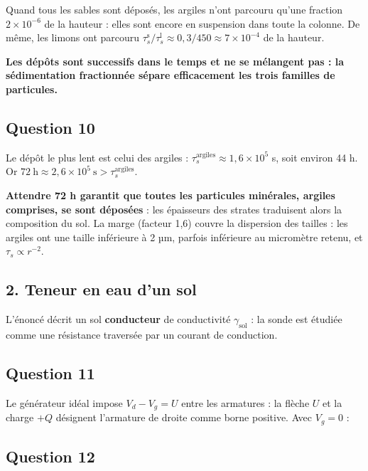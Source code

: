 \documentclass[11pt,a4paper]{article}
\newcommand{\equationajustee}[1]{%
  \sbox{\boiteequation}{$\displaystyle #1$}%
  \ifdim\wd\boiteequation>\linewidth
    \[\resizebox{\linewidth}{!}{\usebox{\boiteequation}}\]%
  \else
    \[#1\]%
  \fi}
\begin{document}
Quand tous les sables sont déposés, les argiles n'ont parcouru qu'une fraction \(2\times10^{-6}\) de la hauteur : elles sont encore en suspension dans toute la colonne. De même, les limons ont parcouru \(\tau_s^{\text{s}}/\tau_s^{\text{l}}\approx0{,}3/450\approx7\times10^{-4}\) de la hauteur.

\textbf{Les dépôts sont successifs dans le temps et ne se mélangent pas : la sédimentation fractionnée sépare efficacement les trois familles de particules.}

\hypertarget{question-10}{%
\subsection{Question 10}\label{question-10}}

Le dépôt le plus lent est celui des argiles : \(\tau_s^{\text{argiles}}\approx1{,}6\times10^{5}\) s, soit environ 44 h. Or \(72\ \mathrm h\approx2{,}6\times10^{5}\ \mathrm s>\tau_s^{\text{argiles}}\).

\textbf{Attendre 72 h garantit que toutes les particules minérales, argiles comprises, se sont déposées} : les épaisseurs des strates traduisent alors la composition du sol. La marge (facteur 1,6) couvre la dispersion des tailles : les argiles ont une taille inférieure à 2 µm, parfois inférieure au micromètre retenu, et \(\tau_s\propto r^{-2}\).

\hypertarget{teneur-en-eau-dun-sol}{%
\subsection{2. Teneur en eau d'un sol}\label{teneur-en-eau-dun-sol}}

L'énoncé décrit un sol \textbf{conducteur} de conductivité \(\gamma_{\text{sol}}\) : la sonde est étudiée comme une résistance traversée par un courant de conduction.

\hypertarget{question-11}{%
\subsection{Question 11}\label{question-11}}

Le générateur idéal impose \(V_d-V_g=U\) entre les armatures : la flèche \(U\) et la charge \(+Q\) désignent l'armature de droite comme borne positive. Avec \(V_g=0\) :

\equationajustee{\boxed{V_d=U}}

\hypertarget{question-12}{%
\subsection{Question 12}\label{question-12}}
\end{document}
